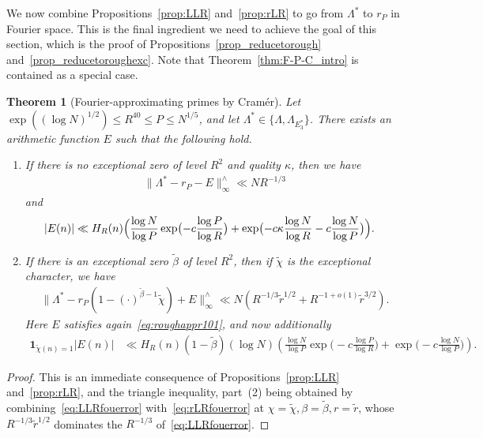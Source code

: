 \documentclass[12pt]{amsart}
\newtheorem{theorem}{Theorem}[section]
\theoremstyle{definition}
\theoremstyle{remark}
\numberwithin{equation}{section}
\newcommand{\1}{\mathbf{1}}
\begin{document}
We now combine Propositions~\ref{prop:LLR} and~\ref{prop:rLR} to go from $\Lambda^*$ to $r_P$ in Fourier space. This is the final ingredient we need to achieve the goal of this section, which is the proof of Propositions~\ref{prop_reducetorough} and~\ref{prop_reducetoroughexc}. Note that Theorem~\ref{thm:F-P-C_intro} is contained as a special case.
\begin{theorem}[Fourier-approximating primes by Cram\'er]\label{thm:gallagher_application}
    Let $\exp((\log N)^{1/2})\leq R^{40}\leq P\leq N^{1/5}$, and
    let $\Lambda^*\in \{\Lambda, \Lambda_{E_3^*}\}$. There exists an arithmetic function $E$  such that the following hold.
	\begin{enumerate}
	   \item If there is no exceptional zero of level $R^2$ and quality $\kappa$, then we have
		\begin{align}\label{eq:roughappr1}
		  \|\Lambda^{*}-r_{P}-E\|_{\infty}^{\wedge}\ll N R^{-1/3}
		\end{align}
	    and
	   \begin{align}
             \label{eq:roughappr101} |E(n)|&\ll H_R(n) \Bigl(\frac{\log N}{\log P}\exp\bigl(-c\frac{\log P}{\log R} \bigr)+\exp\bigl( -c \kappa \frac{\log N}{\log R} -c \frac{\log N}{\log P}\bigr)\Bigr).
	   \end{align}
		\item If there is an exceptional zero $\widetilde{\beta}$ of level $R^2$, then if $\widetilde{\chi}$ is the exceptional character, we have
			\begin{align}\label{eq:roughapprexcfouerror}
				\|\Lambda^{*}-r_P(1-(\cdot)^{\widetilde{\beta}-1}\widetilde{\chi})+E\|_{\infty}^{\wedge}\ll N (R^{-1/3}\widetilde{r}^{1/2}+R^{-1+o(1)}\widetilde{r}^{3/2}).
			\end{align}
             Here $E$ satisfies again~\eqref{eq:roughappr101}, and now additionally  
	       \begin{align}	\label{eq:roughapprexcerror}
              \1_{\widetilde{\chi}(n)=1}|E(n)|&\ll H_R(n) (1-\widetilde{\beta})(\log N)\left( \frac{\log N}{\log P}\exp\bigl(-c\frac{\log P}{\log R} \bigr)+\exp\bigl(-c\frac{\log N}{\log P}\bigr)\right).
			\end{align}
	\end{enumerate}
\end{theorem}
	
\begin{proof}
This is an immediate consequence of Propositions~\ref{prop:LLR} and~\ref{prop:rLR}, and the triangle inequality, part~(2) being obtained by combining~\eqref{eq:LLRfouerror} with~\eqref{eq:rLRfouerror} at $\chi=\widetilde{\chi},\beta=\widetilde{\beta},r=\widetilde{r}$, whose $R^{-1/3}\widetilde{r}^{1/2}$ dominates the $R^{-1/3}$ of~\eqref{eq:LLRfouerror}.



\end{proof}
\end{document}
